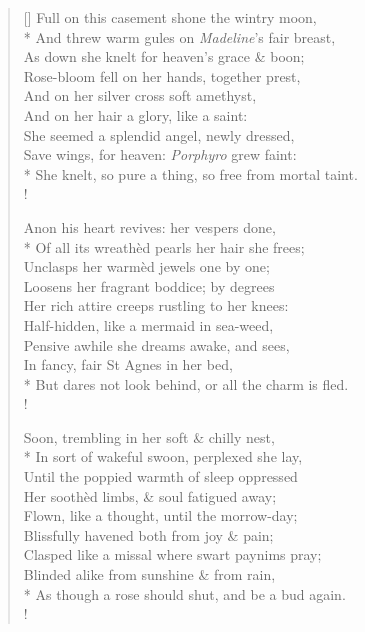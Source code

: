 \documentclass[MAIN]{subfiles}
\begin{document}
\begin{verse}[\versewidth]
\vin Full on this casement shone the wintry moon,\\*
\vin And threw warm gules on \emph{Madeline}'s fair breast,\\
\vin As down she knelt for heaven's grace \& boon;\\
\vin Rose-bloom fell on her hands, together prest,\\
\vin And on her silver cross soft amethyst,\\
\vin And on her hair a glory, like a saint:\\
\vin She seemed a splendid angel, newly dressed,\\
\vin Save wings, for heaven: \emph{Porphyro} grew faint:\\*
She knelt, so pure a thing, so free from mortal taint.\\!

\vin Anon his heart revives: her vespers done,\\*
\vin Of all its wreath\`ed pearls her hair she frees;\\
\vin Unclasps her warm\`ed jewels one by one;\\
\vin Loosens her fragrant boddice; by degrees\\
\vin Her rich attire creeps rustling to her knees:\\
\vin Half-hidden, like a mermaid in sea-weed,\\
\vin Pensive awhile she dreams awake, and sees,\\
\vin In fancy, fair St Agnes in her bed,\\*
But dares not look behind, or all the charm is fled.\\!

\vin Soon, trembling in her soft \& chilly nest,\\*
\vin In sort of wakeful swoon, perplexed she lay,\\
\vin Until the poppied warmth of sleep oppressed\\
\vin Her sooth\`ed limbs, \& soul fatigued away;\\
\vin Flown, like a thought, until the morrow-day;\\
\vin Blissfully havened both from joy \& pain;\\
\vin Clasped like a missal where swart paynims pray;\\
\vin Blinded alike from sunshine \& from rain,\\*
As though a rose should shut, and be a bud again.\\!


\end{verse}
\end{document}
